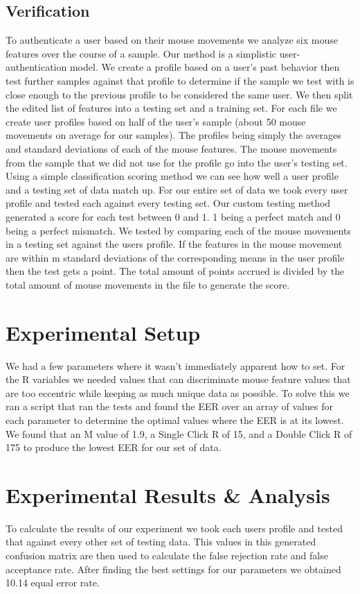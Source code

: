\documentclass[conference]{IEEEtran}
\begin{document}
\subsection{Verification}
	To authenticate a user based on their mouse movements we analyze six mouse features over the course of a sample. Our method is a simplistic user-authentication model. We create a profile based on a user's past behavior then test further samples against that profile to determine if the sample we test with is close enough to the previous profile to be considered the same user.  
We then split the edited list of features into a testing set and a training set. For each file we create user profiles based on half of the user's sample (about 50 mouse movements on average for our samples). The profiles being simply the averages and standard deviations of each of the mouse features. The mouse movements from the sample that we did not use for the profile go into the user's testing set.
Using a simple classification scoring method we can see how well a user profile and a testing set of data match up. For our entire set of data we took every user profile and tested each against every testing set. Our custom testing method generated a score for each test between 0 and 1. 1 being a perfect match and 0 being a perfect mismatch.
We tested by comparing each of the mouse movements in a testing set against the users profile. If the features in the mouse movement are within m standard deviations of the corresponding means in the user profile then the test gets a point. The total amount of points accrued is divided by the total amount of mouse movements in the file to generate the score.
	
\section{Experimental Setup}
We had a few parameters where it wasn’t immediately apparent how to set. For the R variables we needed values that can discriminate mouse feature values that are too eccentric while keeping as much unique data as possible. To solve this we ran a script that ran the tests and found the EER over an array of values for each parameter to determine the optimal values where the EER is at its lowest. We found that an M value of 1.9, a Single Click R of 15, and a Double Click R of 175 to produce the lowest EER for our set of data.

\section{Experimental Results \& Analysis}
To calculate the results of our experiment we took each users profile and tested that against every other set of testing data. This values in this generated confusion matrix are then used to calculate the false rejection rate and false acceptance rate. After finding the best settings for our parameters we obtained 10.14 equal error rate. 
\end{document}
